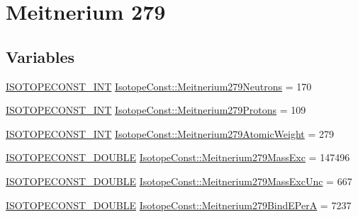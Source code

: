\hypertarget{group___isotope_const-_meitnerium-_mt279}{}\section{Meitnerium 279}
\label{group___isotope_const-_meitnerium-_mt279}
\subsection*{Variables}
\begin{DoxyCompactItemize}
\item 
\mbox{\hyperlink{group___isotope_const-_macros_ga5f18360b3e99483a35c32d789e62621c}{I\+S\+O\+T\+O\+P\+E\+C\+O\+N\+S\+T\+\_\+\+I\+NT}} \mbox{\hyperlink{group___isotope_const-_meitnerium-_mt279_gaf32f9d5dd2af64a6e7028f366d0938d4}{Isotope\+Const\+::\+Meitnerium279\+Neutrons}} = 170
\item 
\mbox{\hyperlink{group___isotope_const-_macros_ga5f18360b3e99483a35c32d789e62621c}{I\+S\+O\+T\+O\+P\+E\+C\+O\+N\+S\+T\+\_\+\+I\+NT}} \mbox{\hyperlink{group___isotope_const-_meitnerium-_mt279_gaa4fd0b842854805b582514f45b2dc80a}{Isotope\+Const\+::\+Meitnerium279\+Protons}} = 109
\item 
\mbox{\hyperlink{group___isotope_const-_macros_ga5f18360b3e99483a35c32d789e62621c}{I\+S\+O\+T\+O\+P\+E\+C\+O\+N\+S\+T\+\_\+\+I\+NT}} \mbox{\hyperlink{group___isotope_const-_meitnerium-_mt279_ga3f25fa3b0793af8c6b2385a11f83539e}{Isotope\+Const\+::\+Meitnerium279\+Atomic\+Weight}} = 279
\item 
\mbox{\hyperlink{group___isotope_const-_macros_ga8f45a7272ce02c0b4c65c44636ed719a}{I\+S\+O\+T\+O\+P\+E\+C\+O\+N\+S\+T\+\_\+\+D\+O\+U\+B\+LE}} \mbox{\hyperlink{group___isotope_const-_meitnerium-_mt279_gad9e3ced4def3e3fdef51e2fa3b12910b}{Isotope\+Const\+::\+Meitnerium279\+Mass\+Exc}} = 147496
\item 
\mbox{\hyperlink{group___isotope_const-_macros_ga8f45a7272ce02c0b4c65c44636ed719a}{I\+S\+O\+T\+O\+P\+E\+C\+O\+N\+S\+T\+\_\+\+D\+O\+U\+B\+LE}} \mbox{\hyperlink{group___isotope_const-_meitnerium-_mt279_gacba907dbc8989ecf78e2a9edf468e4d5}{Isotope\+Const\+::\+Meitnerium279\+Mass\+Exc\+Unc}} = 667
\item 
\mbox{\hyperlink{group___isotope_const-_macros_ga8f45a7272ce02c0b4c65c44636ed719a}{I\+S\+O\+T\+O\+P\+E\+C\+O\+N\+S\+T\+\_\+\+D\+O\+U\+B\+LE}} \mbox{\hyperlink{group___isotope_const-_meitnerium-_mt279_ga4c19d00e12cd3411293b6dd00d566743}{Isotope\+Const\+::\+Meitnerium279\+Bind\+E\+PerA}} = 7237
\item 

\end{DoxyCompactItemize}
